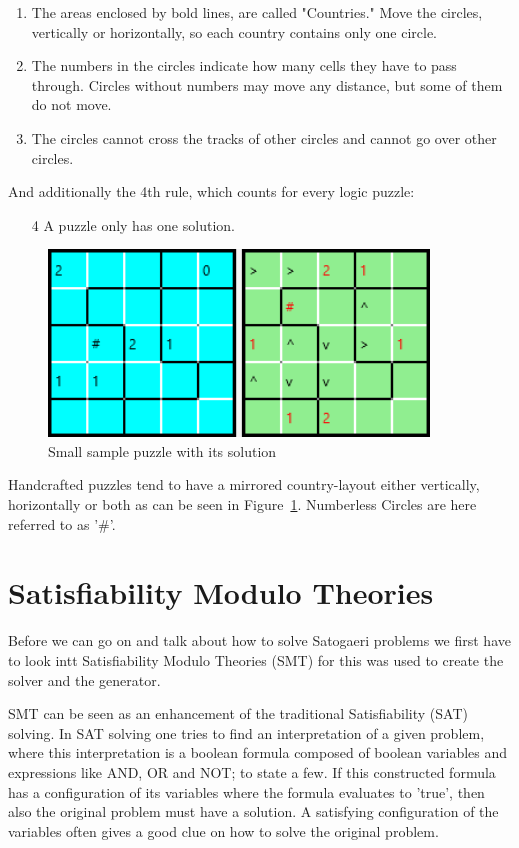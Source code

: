 \begin{enumerate}
  \item The areas enclosed by bold lines, are called "Countries." Move the circles, vertically or horizontally, so each country contains only one circle.
  \item The numbers in the circles indicate how many cells they have to pass through. Circles without numbers may move any distance, but some of them do not move.
  \item The circles cannot cross the tracks of other circles and cannot go over other circles. 
\end{enumerate}
And additionally the 4th rule, which counts for every logic puzzle:
\begin{enumerate}
  \item[4] A puzzle only has one solution.
\end{enumerate}

\begin{figure}
  \centering
  \includegraphics[width=0.9\textwidth]{Pictures/sample_small.png} 
  \caption{Small sample puzzle with its solution}
  \label{fig:sample_small}
\end{figure}

Handcrafted puzzles tend to have a mirrored country-layout either vertically, horizontally or both as can be seen in Figure~\ref{fig:sample_small}. Numberless Circles are here referred to as '\#'.

\section{Satisfiability Modulo Theories} \label{Satisfiability Modulo Theories}
Before we can go on and talk about how to solve Satogaeri problems we first have to look intt Satisfiability Modulo Theories (SMT) for this was used to create the solver and the generator.

SMT can be seen as an enhancement of the traditional Satisfiability (SAT) solving. In SAT solving one tries to find an interpretation of a given problem, where this interpretation is a boolean formula composed of boolean variables and expressions like AND, OR and NOT; to state a few. If this constructed formula has a configuration of its variables where the formula evaluates to 'true', then also the original problem must have a solution. A satisfying configuration of the variables often gives a good clue on how to solve the original problem.

